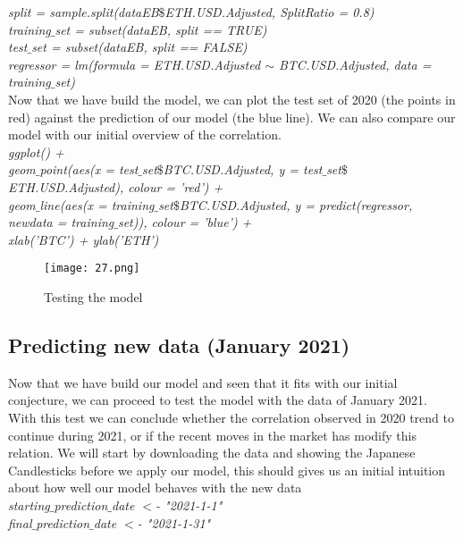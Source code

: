 \documentclass[14pt]{amsart}
\begin{document}
\noindent\textit{split = sample.split(dataEB$\$$ETH.USD.Adjusted, SplitRatio = 0.8)}\\
\noindent\textit{training$\_$set = subset(dataEB, split == TRUE)}\\
\noindent\textit{test$\_$set = subset(dataEB, split == FALSE)}\\

\noindent\textit{regressor = lm(formula = ETH.USD.Adjusted $\sim$ BTC.USD.Adjusted, data = training$\_$set)}\\

Now that we have build the model, we can plot the test set of 2020 (the points in red) against the prediction of our model (the blue line). We can also compare our model with our initial overview of the correlation.\\

\noindent\textit{ggplot() +}\\
\indent\textit{geom$\_$point(aes(x = test$\_$set$\$$BTC.USD.Adjusted, y = test$\_$set$\$$ETH.USD.Adjusted), colour = 'red') +}\\
\indent\textit{geom$\_$line(aes(x = training$\_$set$\$$BTC.USD.Adjusted, y = predict(regressor, newdata = training$\_$set)), colour = 'blue') +}\\
\indent\textit{xlab('BTC') + ylab('ETH')}\\

\begin{figure}[h!]
  \texttt{[image: 27.png]}
  \caption{Testing the model}
  \label{fig:boat1}
\end{figure}

\subsection{Predicting new data (January 2021)}
Now that we have build our model and seen that it fits with our initial conjecture, we can proceed to test the model with the data of January 2021. With this test we can conclude whether the correlation observed in 2020 trend to continue during 2021, or if the recent moves in the market has modify this relation. We will start by downloading the data and showing the Japanese Candlesticks before we apply our model, this should gives us an initial intuition about how well our model behaves with the new data\\

\noindent\textit{starting$\_$prediction$\_$date $<$- "2021-1-1"}\\
\noindent\textit{final$\_$prediction$\_$date $<$- "2021-1-31"}\\
\end{document}
